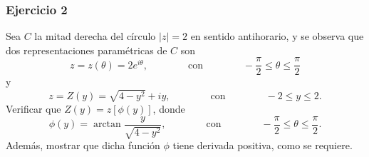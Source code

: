 \documentclass[a4paper]{report}
\begin{document}
\subsubsection{Ejercicio 2}

Sea \(C\) la mitad derecha del círculo \(|z|=2\) en sentido antihorario, y se observa que dos representaciones paramétricas de \(C\) son 
\[
 z=z(\theta)=2e^{i\theta},
 \qquad\qquad\textrm{con}\qquad\qquad
 -\frac{\pi}{2}\leq\theta\leq\frac{\pi}{2} 
\]
y
\[
 z=Z(y)=\sqrt{4-y^2}+iy,
 \qquad\qquad\textrm{con}\qquad\qquad
 -2\leq y\leq2.
\]
Verificar que \(Z(y)=z[\phi(y)]\), donde 
\[
 \phi(y)=\arctan\frac{y}{\sqrt{4-y^2}},
 \qquad\qquad\textrm{con}\qquad\qquad
 -\frac{\pi}{2}\leq\theta\leq\frac{\pi}{2}. 
\]
Además, mostrar que dicha función \(\phi\) tiene derivada positiva, como se requiere. 
\end{document}
